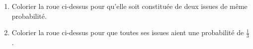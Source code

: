 \begin{center}
\end{center}

\begin{enumerate}
    \item Colorier la roue ci-dessus pour qu'elle soit constituée de deux issues de même probabilité.
    \item Colorier la roue ci-dessus pour que toutes ses issues aient une probabilité de $\frac{1}{3}$.
\end{enumerate}